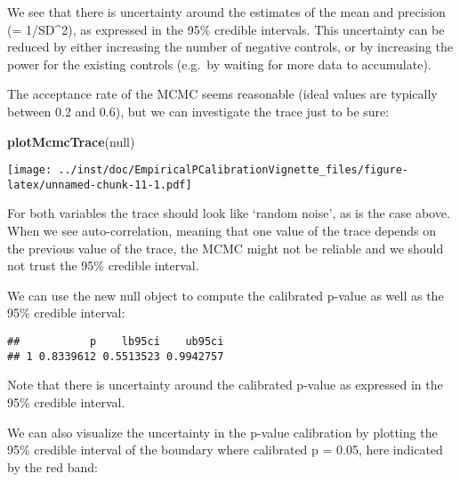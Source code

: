 \documentclass[
]{article}
\newenvironment{Shaded}{\begin{snugshade}}{\end{snugshade}}
\newcommand{\DataTypeTok}[1]{\textcolor[rgb]{0.13,0.29,0.53}{#1}}
\newcommand{\KeywordTok}[1]{\textcolor[rgb]{0.13,0.29,0.53}{\textbf{#1}}}
\newcommand{\NormalTok}[1]{#1}
\newcommand{\OperatorTok}[1]{\textcolor[rgb]{0.81,0.36,0.00}{\textbf{#1}}}
\newcommand{\OtherTok}[1]{\textcolor[rgb]{0.56,0.35,0.01}{#1}}
\newcommand{\StringTok}[1]{\textcolor[rgb]{0.31,0.60,0.02}{#1}}
\begin{document}
We see that there is uncertainty around the estimates of the mean and
precision (= 1/SD\^{}2), as expressed in the 95\% credible intervals.
This uncertainty can be reduced by either increasing the number of
negative controls, or by increasing the power for the existing controls
(e.g.~by waiting for more data to accumulate).

The acceptance rate of the MCMC seems reasonable (ideal values are
typically between 0.2 and 0.6), but we can investigate the trace just to
be sure:

\begin{Shaded}
\begin{Highlighting}[]
\KeywordTok{plotMcmcTrace}\NormalTok{(null)}
\end{Highlighting}
\end{Shaded}

\texttt{[image: ../inst/doc/EmpiricalPCalibrationVignette\_files/figure-latex/unnamed-chunk-11-1.pdf]}

For both variables the trace should look like `random noise', as is the
case above. When we see auto-correlation, meaning that one value of the
trace depends on the previous value of the trace, the MCMC might not be
reliable and we should not trust the 95\% credible interval.

We can use the new null object to compute the calibrated p-value as well
as the 95\% credible interval:

\begin{Shaded}
\end{Shaded}

\begin{verbatim}
##           p    lb95ci    ub95ci
## 1 0.8339612 0.5513523 0.9942757
\end{verbatim}

Note that there is uncertainty around the calibrated p-value as
expressed in the 95\% credible interval.

We can also visualize the uncertainty in the p-value calibration by
plotting the 95\% credible interval of the boundary where calibrated p =
0.05, here indicated by the red band:

\begin{Shaded}
\end{Shaded}
\end{document}
